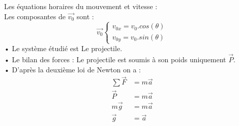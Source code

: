 \documentclass[10pt]{beamer}
\begin{document}
\begin{frame}
\begin{alertblock}{}
Les équations horaires du mouvement et vitesse :\\
Les composantes de $\vec{v_{0}}$ sont :
$$ \vec{v_{0}} \left\{
    \begin{array}{ll}
        v_{0x} = v_{0}.cos(\theta) \\ 
        v_{0y} = v_{0}.sin(\theta) 
    \end{array}
\right.$$
• Le système étudié est {Le projectile}.\\
• Le bilan des forces : Le projectile est soumis à son poids uniquement $\vec{P}$.\\
• D’après la deuxième loi de Newton on a :
\begin{align}
\sum \vec{F}  &= m\vec{a}\\
 \vec{P} &= m\vec{a}\\
  m\vec{g} &= m\vec{a}\\
  \vec{g} &= \vec{a} 
\end{align}
\end{alertblock}
\end{frame}
\end{document}
